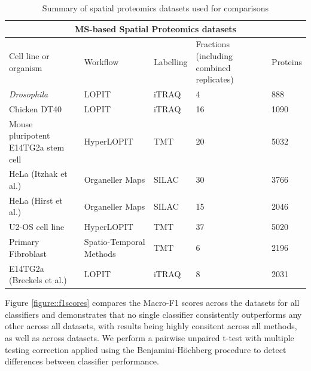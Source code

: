 \documentclass[12pt,english]{article}\usepackage[]{graphicx}\usepackage[]{color}
\begin{document}
\begin{table}[h]
\centering
\begin{tabular}{ |p{3cm}|p{3cm}|p{2cm}|p{2cm}|p{2cm}|  }
 \hline

 \multicolumn{5}{|c|}{MS-based Spatial Proteomics datasets} \\
 \hline
 Cell line or organism & Workflow & Labelling & Fractions (including combined replicates) & Proteins \\
 \hline
 \hline
 \textit{Drosophila}   &  LOPIT & iTRAQ & 4  & 888\\
 \hline
 Chicken DT40 & LOPIT  & iTRAQ & 16 & 1090 \\
 \hline
 Mouse pluripotent E14TG2a stem cell  &  HyperLOPIT & TMT & 20 & 5032\\
 \hline
 HeLa (Itzhak et al.) & Organeller Maps & SILAC & 30 & 3766\\
 \hline
 HeLa (Hirst et al.) & Organeller Maps  & SILAC & 15 & 2046\\
 \hline
 U2-OS cell line & HyperLOPIT  & TMT & 37 & 5020\\
 \hline
 Primary Fibroblast & Spatio-Temporal Methods & TMT & 6 & 2196 \\
 \hline
 E14TG2a (Breckels et al.)  &  LOPIT & iTRAQ & 8 & 2031\\
\hline
\end{tabular}
\caption{Summary of spatial proteomics datasets used for comparisons}
\label{table:data}
\end{table}

Figure \ref{figure::f1scores} compares the Macro-F1 scores across the
datasets for all classifiers and demonstrates that no single
classifier consistently outperforms any other across all datasets,
with results being highly consitent across all methods, as well as
across datasets. We perform a pairwise unpaired t-test with multiple
testing correction applied using the Benjamini-H\"ochberg procedure
\citep{FDR:1995} to detect differences between classifier performance.
\end{document}
